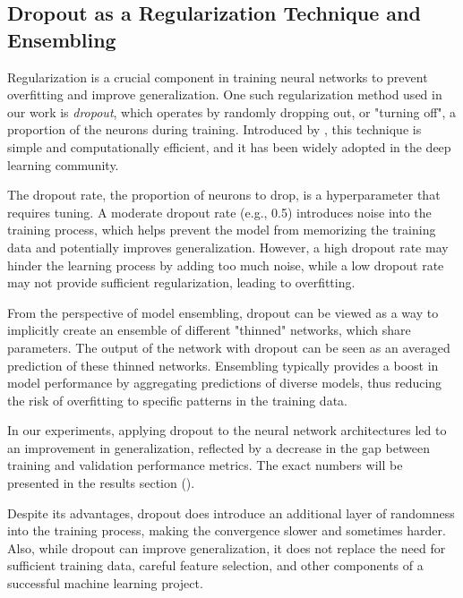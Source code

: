 \subsection{Dropout as a Regularization Technique and Ensembling}

Regularization is a crucial component in training neural networks to prevent overfitting and improve generalization. One
such regularization method used in our work is \emph{dropout}, which operates by randomly dropping out, or "turning
off", a proportion of the neurons during training. Introduced by \cite{dropout}, this
technique is simple and computationally efficient, and it has been widely adopted in the deep learning community.

The dropout rate, the proportion of neurons to drop, is a hyperparameter that requires tuning. A moderate dropout rate
(e.g., 0.5) introduces noise into the training process, which helps prevent the model from memorizing the training data
and potentially improves generalization. However, a high dropout rate may hinder the learning process by adding too much
noise, while a low dropout rate may not provide sufficient regularization, leading to overfitting.

From the perspective of model ensembling, dropout can be viewed as a way to implicitly create an ensemble of different
"thinned" networks, which share parameters. The output of the network with dropout can be seen as an averaged prediction
of these thinned networks. Ensembling typically provides a boost in model performance by aggregating predictions of
diverse models, thus reducing the risk of overfitting to specific patterns in the training data.

In our experiments, applying dropout to the neural network architectures led to an improvement in generalization,
reflected by a decrease in the gap between training and validation performance metrics. The exact numbers will be
presented in the results section ().

Despite its advantages, dropout does introduce an additional layer of randomness into the training process, making the
convergence slower and sometimes harder. Also, while dropout can improve generalization, it does not replace the need
for sufficient training data, careful feature selection, and other components of a successful machine learning project.